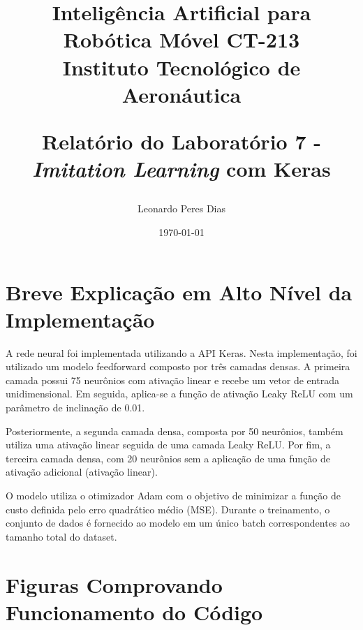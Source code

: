 \documentclass[a4paper,12pt]{article}
\title{
    \textbf{Inteligência Artificial para Robótica Móvel CT-213}\\
    \Large Instituto Tecnológico de Aeronáutica 

    \textbf{Relatório do Laboratório 7 - \textit{Imitation Learning} com Keras}\\
}
\author{
    Leonardo Peres Dias 
}
\date{\today}
\begin{document}
\BgThispage
\maketitle
\thispagestyle{empty} %


\newpage
\NoBgThispage %

\tableofcontents

\newpage
\NoBgThispage %

\section{Breve Explicação em Alto Nível da Implementação}

A rede neural foi implementada utilizando a API Keras. Nesta implementação, foi utilizado um modelo feedforward composto por três camadas densas. A primeira camada possui 75 neurônios com ativação linear e recebe um vetor de entrada unidimensional. Em seguida, aplica-se a função de ativação Leaky ReLU com um parâmetro de inclinação de 0.01.

Posteriormente, a segunda camada densa, composta por 50 neurônios, também utiliza uma ativação linear seguida de uma camada Leaky ReLU. Por fim, a terceira camada densa, com 20 neurônios sem a aplicação de uma função de ativação adicional (ativação linear).

O modelo utiliza o otimizador Adam com o objetivo de minimizar a função de custo definida pelo erro quadrático médio (MSE). Durante o treinamento, o conjunto de dados é fornecido ao modelo em um único batch correspondentes ao tamanho total do dataset.

\newpage

\section{Figuras Comprovando Funcionamento do Código}
\end{document}
